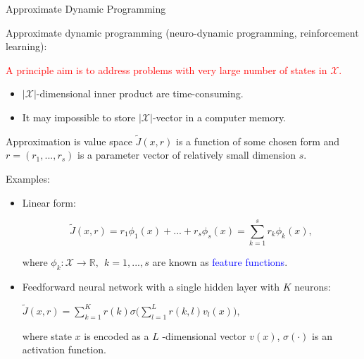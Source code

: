 \documentclass{beamer}
\def\R{{\mathbb R}}
\def\X{{\mathcal X}}
\newcommand{\blue}[1]{\textcolor{blue}{#1}}
\newcommand{\red}[1]{\textcolor{red}{#1}}
\begin{document}
\begin{frame}{Approximate Dynamic Programming}

Approximate dynamic programming (neuro-dynamic programming, reinforcement learning):



  \red{A principle aim is to address problems with very large number of states in $\X.$}
 \begin{itemize}
   \item  $|\X|$-dimensional inner product are time-consuming.
   \item It may impossible to store $|\X|$-vector in a computer memory.

 \end{itemize}

 


\end{frame}


\begin{frame}{Approximation is value space}
 $\tilde J(x, r)$ is a function of some chosen form and $r = (r_1, ..., r_s)$ is a parameter vector of relatively small dimension $s$.

Examples:
\begin{itemize}
  \item Linear form:
  
  $$
\tilde J(x, r) = r_1\phi_1(x)+...+ r_s\phi_s(x)=\sum\limits_{k=1}^s r_k \phi_k(x),
  $$
  
  where $\phi_k:\X\rightarrow \R, ~~k=1,...,s$ are  known as \blue{feature functions}.
  \item Feedforward neural network with a single hidden layer with $K$ neurons:
  \begin{center}
  $
  \tilde J(x, r) = \sum\limits_{k=1}^K r(k)\sigma\Big( \sum\limits_{l=1}^L r(k, l)v_l(x) \Big),
  $
  \end{center}
  where state $x$ is encoded as a $L$ -dimensional vector $v(x)$, $\sigma(\cdot)$ is an activation function.
\end{itemize}


\end{frame}
\end{document}
